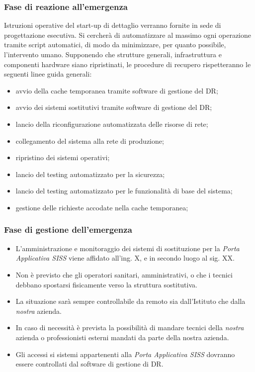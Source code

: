 \subsubsection{Fase di reazione all’emergenza}
Istruzioni operative del start-up di dettaglio verranno fornite in sede di progettazione esecutiva. Si cercherà di automatizzare al massimo ogni operazione tramite script automatici, di modo da minimizzare, per quanto possibile, l'intervento umano. 
Supponendo che strutture generali, infrastruttura e componenti hardware siano ripristinati, le procedure di recupero rispetteranno le seguenti linee guida generali:
\begin{itemize}
\item avvio della cache temporanea tramite software di gestione del DR;
\item avvio dei sistemi sostitutivi tramite software di gestione del DR;
\item lancio della riconfigurazione automatizzata delle risorse di rete;
\item collegamento del sistema alla rete di produzione;
\item ripristino dei sistemi operativi;
\item lancio del testing automatizzato per la sicurezza;
\item lancio del testing automatizzato per le funzionalità di base del sistema;
\item gestione delle richieste accodate nella cache temporanea;
\end{itemize}

\subsubsection{Fase di gestione dell’emergenza}
\begin{itemize}
\item L'amministrazione e monitoraggio dei sistemi di sostituzione per la \textit{Porta Applicativa SISS} viene affidato all'ing. X, e in secondo luogo al sig. XX.
\item Non è previsto che gli operatori sanitari, amministrativi, o che i tecnici debbano spostarsi fisicamente verso la struttura sostitutiva.
\item La situazione sarà sempre controllabile da remoto sia dall'Istituto che dalla \textit{nostra} azienda.
\item In caso di necessità è prevista la possibilità di mandare tecnici della \textit{nostra} azienda o professionisti esterni mandati da parte della nostra azienda.
\item Gli accessi si sistemi appartenenti alla \textit{Porta Applicativa SISS} dovranno essere controllati dal software di gestione di DR.
\end{itemize}

